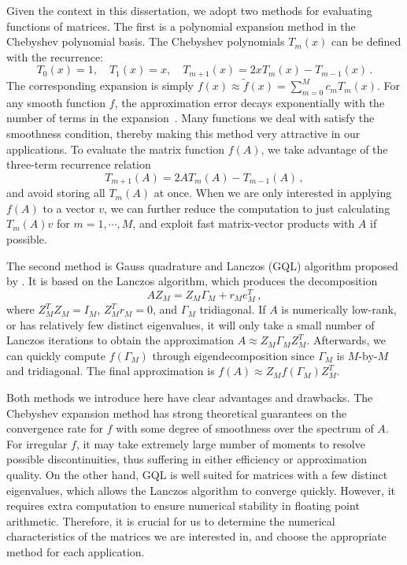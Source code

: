 Given the context in this dissertation, we adopt two methods for evaluating
functions of matrices. The first is a polynomial expansion method in the
Chebyshev polynomial basis. The Chebyshev polynomials $T_m(x)$ can be defined
with the recurrence:
\begin{equation}\label{eqn:cheb_3term}
	T_0(x) = 1,\quad T_1(x) = x,\quad T_{m+1}(x) = 2xT_m(x) - T_{m-1}(x)\,.
\end{equation}
The corresponding expansion is simply $f(x) \approx \tilde{f}(x)= \sum_
{m=0}^Mc_mT_m(x)$. For any smooth function $f$, the approximation error decays
exponentially with the number of terms in the expansion~\cite{
Trefethen-2013-ATAP}. Many functions we deal with satisfy the smoothness
condition, thereby making this method very attractive in our applications. To
evaluate the matrix function $f(A)$, we take advantage of the three\hyp{}term
recurrence relation
\begin{equation}\label{eqn:3term_fom}
	T_{m+1}(A) = 2AT_m(A)-T_{m-1}(A)\,,
\end{equation}
and avoid storing all $T_m(A)$ at once. When we are only interested in applying
$f(A)$ to a vector $v$, we can further reduce the computation to just
calculating $T_m(A)v$ for $m = 1,\cdots, M$, and exploit fast matrix\hyp{}vector
products with $A$ if possible.

The second method is Gauss quadrature and Lanczos (GQL) algorithm proposed by 
\citet{golub1997matrices}. It is based on the Lanczos algorithm, which produces
the decomposition
\begin{equation}\label{eqn:lan_decomp}
	AZ_M = Z_M\Gamma_M + r_Me_M^T\,,
\end{equation}
where $Z_M^TZ_M = I_M$, $Z_M^Tr_M = 0$, and $\Gamma_M$ tridiagonal. If $A$ is
numerically low\hyp{}rank, or has relatively few distinct eigenvalues, it will
only take a small number of Lanczos iterations to obtain the approximation
$A\approx Z_M\Gamma_MZ_M^T$. Afterwards, we can quickly compute $f(\Gamma_M)$
through eigendecomposition since $\Gamma_M$ is $M$\hyp{}by\hyp{}$M$ and
tridiagonal. The final approximation is $f(A) \approx Z_Mf(\Gamma_M)Z_M^T$.

Both methods we introduce here have clear advantages and drawbacks. The
Chebyshev expansion method has strong theoretical guarantees on the convergence
rate for $f$ with some degree of smoothness over the spectrum of $A$. For
irregular $f$, it may take extremely large number of moments to resolve possible
discontinuities, thus suffering in either efficiency or approximation quality.
On the other hand, GQL is well suited for matrices with a few distinct
eigenvalues, which allows the Lanczos algorithm to converge quickly. However, it
requires extra computation to ensure numerical stability in floating point
arithmetic. Therefore, it is crucial for us to determine the numerical
characteristics of the matrices we are interested in, and choose the appropriate
method for each application.

